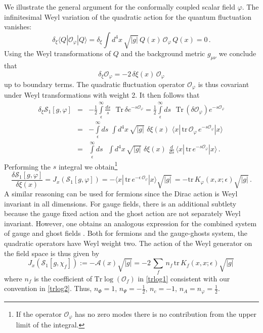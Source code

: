 \documentclass[12pt,a4paper]{article}
\newcommand{\bea}{\begin{eqnarray}}
\newcommand{\eea}{\end{eqnarray}}
\newcommand{\be}{\begin{equation}}
\newcommand{\ee}{\end{equation}}
\newcommand{\cA}{\mathcal{A}}
\newcommand{\cO}{\mathcal{O}}
\newcommand{\cS}{\mathcal{S}}
\renewcommand{\d}{\delta}
\newcommand{\e}{\epsilon}
\newcommand{\m}{\mu}
\newcommand{\n}{\nu}
\newcommand{\1}{{\textbf{1}}}
\newcommand{\half}{\frac{1}{2}}
\newcommand{\Tr}{\mbox{Tr}}
\newcommand{\tr}{\mbox{tr}}
\newcommand{\+}{{\,+ \,}}
\begin{document}
We illustrate the general argument for the conformally coupled scalar field $\varphi$. The
infinitesimal Weyl variation of the quadratic action for the quantum fluctuation vanishes:
\be
\delta_{\xi} \langle Q | \cO_{\varphi} |Q\rangle =  \d_{\xi} \int d^{4}x \,\sqrt{|g|}\, Q(x)  \,\cO_{\varphi}\, Q(x) =0 \, .
\ee
Using the  Weyl transformations of $Q$ and the background metric $g_{\m\n}$ we conclude that 
 \be
 \d_{\xi} \cO_{\varphi} = -2\, \delta \xi(x) \,\cO_{\varphi}
 \ee
 up to boundary terms. The quadratic fluctuation operator $\cO_{\varphi}$ is thus covariant  under Weyl transformations with weight 2.
It then follows that
 \bea
 \delta_{\xi} \cS_{1}[g, \varphi] &=&   -\half \int\limits_\e^\infty \frac{ds}{s} \,\, \,\,  \Tr \,   \delta  e^{-s\cO_{\varphi}} = \half  \int\limits_\e^\infty {ds} \,\, \,\,  \Tr \,   (\delta \cO_{\varphi })  e^{-s\cO_{\varphi}} \\
 &=&   - \int\limits_\e^\infty {ds} \,\,   \int d^{4}x \,\sqrt{|g|}\,\, \d\xi(x)\, \,\langle x| \, \tr \,\cO_{\varphi } \,  e^{-s\cO_{\varphi}}| x \rangle \\
 &=&   \int\limits_\e^\infty {ds} \,\, \,\, \int d^{4}x \,\sqrt{|g|}\,\,\d\xi(x) \,\,\frac{d}{ds} \,   \langle x| \, \tr   \,e^{-s\cO_{\varphi}}| x \rangle\, .
    \eea
 Performing the $s$ integral we obtain\footnote{If  the operator $\cO_{\varphi}$ has no zero modes there is no contribution from the upper limit of the integral.}
 \be
\frac{ \delta \cS_{1}[g, \varphi]}{\d \xi(x)} = J_{x}\left(  \cS_{1}[g, \varphi]\right) =
 -   \langle x|\, \tr \,  e^{-\e\,\cO_{\varphi}} |x \rangle \sqrt{|g|}\, 
 = - \tr \,K_{\varphi}(x, x;\e) \sqrt{|g|}\,  . 
 \ee
A similar reasoning can be used for fermions since the Dirac action is Weyl invariant in all dimensions. For gauge fields, there is an additional subtlety because the gauge fixed action  and the ghost action are not separately Weyl invariant. However, one obtains  an analogous expression for the combined system of gauge and ghost fields \cite{Codello:2012sn}.   Both for fermions and the gauge-ghosts system, the quadratic operators have Weyl weight two. The action of the Weyl generator on the field space is thus given by
 \be\label{anomaly1}
J_{x } \left( \cS_{1} [g, \chi_{f}]\right) := -\cA(x) \sqrt{|g|} = - 2\,\sum_{f} \,n_{f} \,\text{tr}\, K_{f}(x,x;\e) \sqrt{|g|}\,
\ee
where $n_{f}$ is the coefficient of  $\Tr \log (\cO_{f})$ in \eqref{trlog1} consistent with our convention in \eqref{trlog2}. 
Thus, $n_{\Phi}=1$, $n_{\Psi}= -\half$,  $n_{c}= -1$, $n_{A}=n_{\varphi}= \half $.
\end{document}
